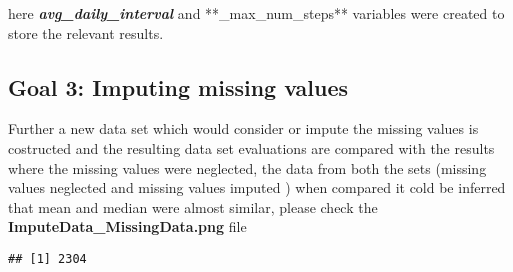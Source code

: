 \documentclass[]{article}
\newenvironment{Shaded}{\begin{snugshade}}{\end{snugshade}}
\newcommand{\KeywordTok}[1]{\textcolor[rgb]{0.13,0.29,0.53}{\textbf{#1}}}
\newcommand{\OperatorTok}[1]{\textcolor[rgb]{0.81,0.36,0.00}{\textbf{#1}}}
\newcommand{\NormalTok}[1]{#1}
\begin{document}
here \textbf{\emph{avg\_daily\_interval}} and **\_max\_num\_steps**
variables were created to store the relevant results.

\subsection{Goal 3: Imputing missing
values}\label{goal-3-imputing-missing-values}

Further a new data set which would consider or impute the missing values
is costructed and the resulting data set evaluations are compared with
the results where the missing values were neglected, the data from both
the sets (missing values neglected and missing values imputed ) when
compared it cold be inferred that mean and median were almost similar,
please check the \textbf{ImputeData\_MissingData.png} file

\begin{Shaded}
\end{Shaded}

\begin{verbatim}
## [1] 2304
\end{verbatim}
\end{document}

